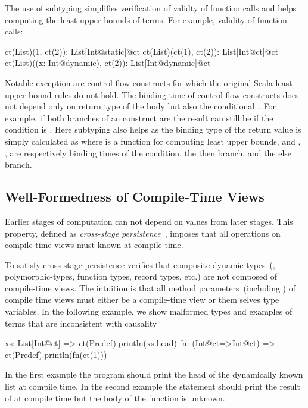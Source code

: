  The use of subtyping simplifies verification of validty of function calls and helps computing the
 least upper bounds of terms. For example, validity of function calls:\begin{lstparagraph}
ct(List)(1, ct(2)): List[Int@static]@ct
ct(List)(ct(1), ct(2)): List[Int@ct]@ct
ct(List)((x: Int@dynamic), ct(2)): List[Int@dynamic]@ct
\end{lstparagraph}

 Notable exception are control flow constructs for which the original Scala least
 upper bound rules do not hold. The binding-time of control flow constructs does not
 depend only on return type of the body but also the conditional~\cite{}. For example, if
 both branches of an  construct are  the result can still be 
 if the condition is . Here subtyping also helps as the binding type of the
 return value is simply calculated as  where  is a function
 for computing least upper bounds, and , ,  are respectively
 binding times of the condition, the then branch, and the else branch.

\subsection{Well-Formedness of Compile-Time Views}
\label{sct:wf-ctv}

Earlier stages of computation can not depend on values from later stages. This property,
 defined as \emph{cross-stage persistence}~\cite{taha_multi-stage_1997,westbrook2010mint},
 imposes that all operations on compile-time views must known at compile time.

To satisfy cross-stage persistence \tool verifies that composite dynamic
 types~(\eg, polymorphic-types, function types, record types, etc.) are not composed
 of compile-time views. The intuition is that all method parameters~(including )
 of compile time views must either be a compile-time view or them selves type variables. In the following example,
 we show malformed types and examples of terms that are inconsistent with causality\begin{lstparagraph}
xs: List[Int@ct]     => ct(Predef).println(xs.head)
fn: (Int@ct=>Int@ct) => ct(Predef).println(fn(ct(1)))
\end{lstparagraph}

In the first example the program should print the head of the dynamically known list
 at compile time. In the second example the statement should print the result of  at
 compile time but the body of the function is unknown.

